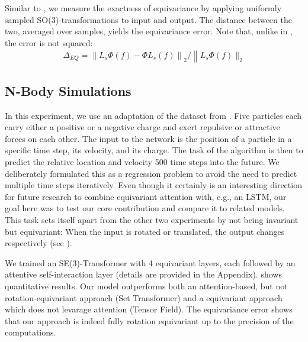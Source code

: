Similar to \cite{Sosnovik20, Worrall19}, we measure the exactness of equivariance by applying uniformly sampled SO(3)-transformations to input and output. The distance between the two, averaged over samples, yields the equivariance error. Note that, unlike in \citet{Sosnovik20}, the error is not squared:
\begin{align}
    \Delta_{EQ}=\left\| L_{s} \Phi(f)-\Phi L_{s}(f)\right\|_{2} /\left\| L_{s} \Phi(f) \|_{2}\right.
\end{align}

\subsection{N-Body Simulations}

In this experiment, we use an adaptation of the dataset from \citet{KipfFWWZ18}. Five particles each carry either a positive or a negative charge and exert repulsive or attractive forces on each other. The input to the network is the position of a particle in a specific time step, its velocity, and its charge. The task of the algorithm is then to predict the relative location and velocity 500 time steps into the future. We deliberately formulated this as a regression problem to avoid the need to predict multiple time steps iteratively. Even though it certainly is an interesting direction for future research to combine equivariant attention with, e.g., an LSTM, our goal here was to test our core contribution and compare it to related models. This task sets itself apart from the other two experiments by not being invariant but equivariant: When the input is rotated or translated, the output changes respectively (see ).


We trained an SE(3)-Transformer with 4 equivariant layers, each followed by an attentive self-interaction layer (details are provided in the Appendix).  shows quantitative results. 
Our model outperforms both an attention-based, but not rotation-equivariant approach (Set Transformer) and a equivariant approach which does not levarage attention (Tensor Field). The equivariance error shows that our approach is indeed fully rotation equivariant up to the precision of the computations.



